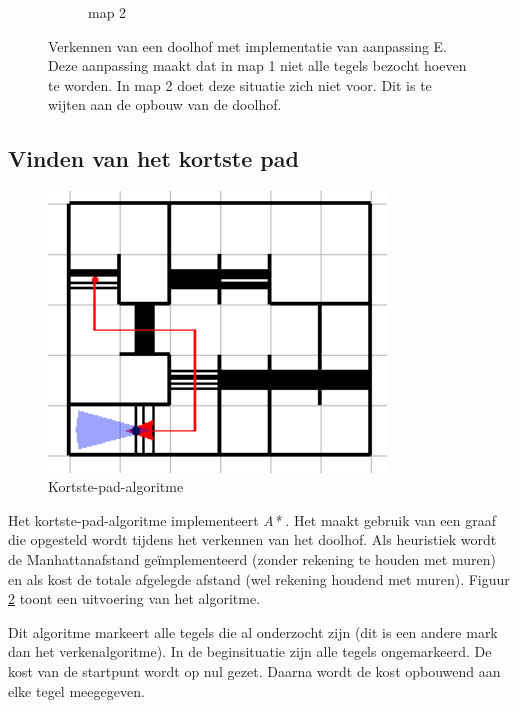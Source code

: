 \documentclass[t1]{penoverslag}
\begin{document}
\begin{figure}
\begin{subfigure}[hb]{0.36\textwidth}
                \caption{map 2}
        \end{subfigure}
 \caption[Verkennen van een doolhof]{Verkennen van een doolhof met implementatie van aanpassing E. Deze aanpassing maakt dat in map 1 niet alle tegels bezocht hoeven te worden. In map 2 doet deze situatie zich niet voor. Dit is te wijten aan de opbouw van de doolhof.}
\label{fig:resultVerkenE}
\end{figure}

\subsection{Vinden van het kortste pad} %
\label{ssec:AlgoKortsteP}

\begin{figure}[tbp]
\begin{center}
    \includegraphics[width=0.8\textwidth]{kortstepadvisual}
    \caption{Kortste-pad-algoritme}
	\label{fig:kortstepad}
\end{center}
\end{figure}

Het kortste-pad-algoritme implementeert \textit{A*} \cite{A*}. Het maakt gebruik van een graaf die opgesteld wordt tijdens het verkennen van het doolhof. Als heuristiek wordt de Manhattanafstand \cite{manhattan} ge\"implementeerd (zonder rekening te houden met muren) en als kost de totale afgelegde afstand (wel rekening houdend met muren). Figuur \ref{fig:kortstepad} toont een uitvoering van het algoritme.

Dit algoritme markeert alle tegels die al onderzocht zijn (dit is een andere mark dan het verkenalgoritme). In de beginsituatie zijn alle tegels ongemarkeerd. De kost van de startpunt wordt op nul gezet. Daarna wordt de kost opbouwend aan elke tegel meegegeven.
\end{document}
